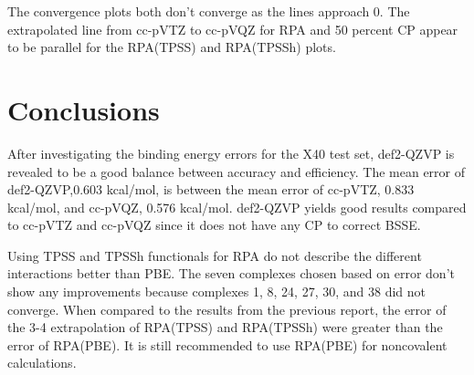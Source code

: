 \documentclass[11pt]{article}
\begin{document}
The convergence plots both don't converge as the lines approach 0. The
extrapolated line from cc-pVTZ to cc-pVQZ for RPA and 50 percent CP
appear to be parallel for the RPA(TPSS) and RPA(TPSSh) plots.

\section{Conclusions}

After investigating the binding energy errors for the X40 test set,
def2-QZVP is revealed to be a good balance between accuracy and
efficiency. The mean error of def2-QZVP,0.603 kcal/mol, is between the
mean error of cc-pVTZ, 0.833 kcal/mol, and cc-pVQZ, 0.576 kcal/mol.
def2-QZVP yields good results compared to cc-pVTZ and cc-pVQZ since it
does not have any CP to correct BSSE.

Using TPSS and TPSSh functionals for RPA do not describe the different
interactions better than PBE. The seven complexes chosen based on error
don't show any improvements because complexes 1, 8, 24, 27, 30, and 38
did not converge. When compared to the results from the previous report,
the error of the 3-4 extrapolation of RPA(TPSS) and RPA(TPSSh) were
greater than the error of RPA(PBE). It is still recommended to use
RPA(PBE) for noncovalent calculations.


\printbibliography
\end{document}
